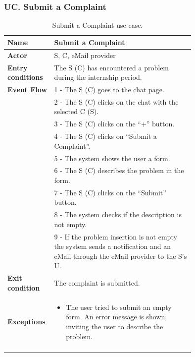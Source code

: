 \subsubsection*{UC\cuc . Submit a Complaint}
\begin{center}
    \begin{longtable}{|l|p{0.75\linewidth}|}
        \hline
        \textbf{Name}               & Submit a Complaint\\
        \hline
        \textbf{Actor}              & S, C, eMail provider\\
        \hline
        \textbf{Entry conditions}   & The S (C) has encountered a problem during the internship period.\\
        \hline
        \textbf{Event Flow}         & 1 - The S (C) goes to the chat page. \\
        & 2 - The S (C) clicks on the chat with the selected C (S). \\
        & 3 - The S (C) clicks on the “+” button. \\
        & 4 - The S (C) clicks on “Submit a Complaint”. \\
        & 5 - The system shows the user a form. \\
        & 6 - The S (C) describes the problem in the form. \\
        & 7 - The S (C) clicks on the “Submit” button. \\
        & 8 - The system checks if the description is not empty. \\
        & 9 - If the problem insertion is not empty the system sends a notification and an eMail through the eMail provider to the S’s U. \\
        \hline
        \textbf{Exit condition}   & The complaint is submitted. \\       
        \hline
        \textbf{Exceptions}       & \begin{itemize}
            \item The user tried to submit an empty form. An error message is shown, inviting the user to describe the problem.
        \end{itemize}\\
        \hline
        \caption{Submit a Complaint use case.}
        \label{tab: submit_a_complaint_use_case}
    \end{longtable}
\end{center}


